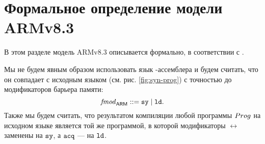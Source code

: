 


\section{Формальное определение модели ARMv8.3} \label{sec:armv83formally}
В этом разделе модель ARMv8.3 описывается  формально, в соответствии с \cite{Pulte-al:POPL18}.

Мы не будем явным образом использовать язык \ARM-ассемблера
и будем считать, что он совпадает с исходным языком (см. рис. \ref{fig:syn-prog}) с точностью до
модификаторов барьера памяти:
\[\mathit{fmod}_{\mathsf{ARM}} ::= \mathtt{sy} \mid \mathtt{ld}. \]
Также мы будем считать, что результатом компиляции любой программы $Prog$ на исходном языке
является той же программой, в которой модификаторы $\rel$ заменены на $\mathtt{sy}$, а ${\mathtt{acq}}$ --- на $\mathtt{ld}$.



